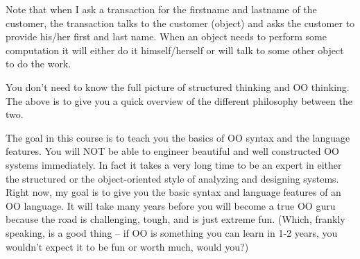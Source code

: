 Note that when I ask a transaction for the firstname and lastname of the
customer, the transaction talks to the customer (object) and asks the
customer to provide his/her first and last name. When an object needs to
perform some computation it will either do it himself/herself or will talk to
some other object to do the work.

You don't need to know the full picture of structured thinking and OO
thinking. The above is to give you a quick overview of the different
philosophy between the two.

The goal in this course is to teach you the basics of OO syntax and the
language features. You will NOT be able to engineer beautiful and well
constructed OO systems immediately. In fact it takes a very long time to
be an expert in either the structured or the object-oriented style of
analyzing and designing systems. Right now, my goal is to give you the
basic syntax and language features of an OO language. It will take many
years before you will become a true OO guru because the road is
challenging, tough, and is just extreme fun. (Which, frankly speaking, is a
good thing -- if OO is something you can learn in 1-2 years, you wouldn't
expect it to be fun or worth much, would you?)



